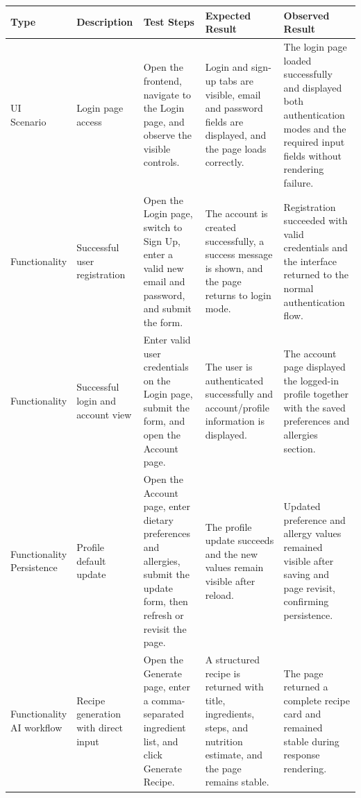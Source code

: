 \begin{table}[H]
	\centering
	\scriptsize
	\renewcommand{\arraystretch}{1.2}
	\begin{tabularx}{\textwidth}{|p{2.2cm}|p{2.0cm}|>{\raggedright\arraybackslash}X|>{\raggedright\arraybackslash}X|>{\raggedright\arraybackslash}X|}
		\hline
		\textbf{Type} & \textbf{Description} & \textbf{Test Steps} & \textbf{Expected Result} & \textbf{Observed Result} \\
		\hline
		\makecell[tl]{UI\\Scenario} & Login page access & Open the frontend, navigate to the Login page, and observe the visible controls. & Login and sign-up tabs are visible, email and password fields are displayed, and the page loads correctly. & The login page loaded successfully and displayed both authentication modes and the required input fields without rendering failure. \\
		\hline
		Functionality & Successful user registration & Open the Login page, switch to Sign Up, enter a valid new email and password, and submit the form. & The account is created successfully, a success message is shown, and the page returns to login mode. & Registration succeeded with valid credentials and the interface returned to the normal authentication flow. \\
		\hline
		Functionality & Successful login and account view & Enter valid user credentials on the Login page, submit the form, and open the Account page. & The user is authenticated successfully and account/profile information is displayed. & The account page displayed the logged-in profile together with the saved preferences and allergies section. \\
		\hline
		\makecell[tl]{Functionality\\Persistence} & Profile default update & Open the Account page, enter dietary preferences and allergies, submit the update form, then refresh or revisit the page. & The profile update succeeds and the new values remain visible after reload. & Updated preference and allergy values remained visible after saving and page revisit, confirming persistence. \\
		\hline
		\makecell[tl]{Functionality\\AI workflow} & Recipe generation with direct input & Open the Generate page, enter a comma-separated ingredient list, and click Generate Recipe. & A structured recipe is returned with title, ingredients, steps, and nutrition estimate, and the page remains stable. & The page returned a complete recipe card and remained stable during response rendering. \\

\end{tabularx}
\end{table}
